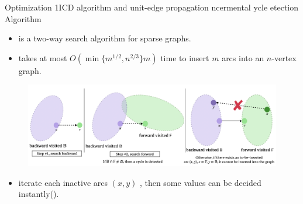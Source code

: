 \begin{frame}{Optimization 1}{ICD algorithm and unit-edge propagation}
	ncermental ycle etection Algorithm
	\begin{itemize}
		\item is a two-way search algorithm for sparse graphs.
		\item takes at most $O(\min\{m^{1/2}, n^{2/3}\}m)$ time to insert $m$ arcs into an $n$-vertex graph.
	\end{itemize}

	\begin{figure}[H]
		\centering
		\includegraphics[width=\textwidth]{figs/ICD-algorithm-and-unit-edge-propagation.png}
	\end{figure}

	\begin{itemize}
		\item iterate each inactive arcs $(x, y)$ , then some values can be decided instantly(). 
	\end{itemize}
\end{frame}

